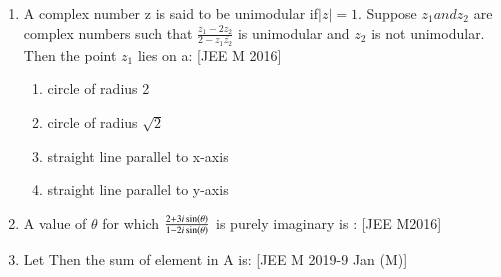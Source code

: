 \documentclass[journal,12pt,twocolumn,article]{IEEEtran}
\theoremstyle{remark}
\begin{document}
\begin{enumerate}[start = 14]
\item A complex number z is said to be unimodular if$|z|=1$. Suppose $z_1 and z_2$ are complex numbers such that $\frac{z_1 -2z_2}{2-z_1\overline{z_2}}$ is unimodular and $z_2$ is not unimodular. Then the point $z_1$ lies on a:                                
\hfill{[JEE M 2016]}                               

\begin{enumerate}                                  
                              
\item \text circle of radius 2
                             
\item \text circle of radius $\sqrt2$ 

\item \text straight line parallel to x-axis 

\item \text  straight line parallel to y-axis

\end{enumerate}

\item A value of $\theta$ for which $\frac{2+3i\sin\left(\theta\right)}{1-2i\sin\left(\theta\right)}$ is purely imaginary is :      
\hfill{[JEE M2016]}

\begin{enumerate}
\end{enumerate}                                     

\item Let   Then the sum of element in A is:
\hfill{[JEE M 2019-9 Jan (M)]}
\begin{enumerate}
\end{enumerate}


\end{enumerate}
\end{document}
